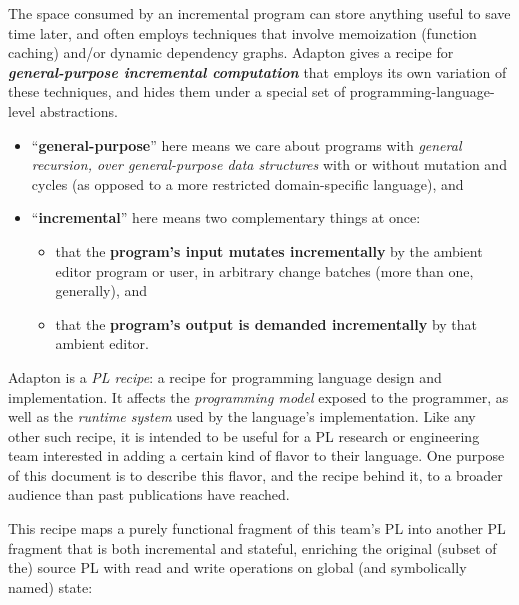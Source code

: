 \documentclass[11pt]{article}
\begin{document}
The space consumed by an incremental program can store anything useful
to save time later, and often employs techniques that involve
memoization (function caching) and/or dynamic dependency graphs.
%
Adapton gives a recipe for \textbf{\emph{general-purpose incremental
  computation}} that employs its own variation of these techniques,
and hides them under a special set of programming-language-level
abstractions.
%
\begin{itemize}
\item ``\textbf{general-purpose}'' here means we care about programs
  with \emph{general recursion, over general-purpose data structures}
  with or without mutation and cycles (as opposed to a more restricted
  domain-specific language), and

\item ``\textbf{incremental}'' here means two complementary things at once:
  \begin {itemize}

  \item that the \textbf{program's input mutates incrementally} by the
    ambient editor program or user, in arbitrary change batches (more than one, generally), and

  \item that the \textbf{program's output is demanded incrementally}
    by that ambient editor.
  \end{itemize}
\end{itemize}

\noindent
Adapton is a \emph{PL recipe}: a recipe for programming language
design and implementation.
%
It affects the \emph{programming model} exposed to the
programmer, as well as the \emph{runtime system} used by the
language's implementation.
%
Like any other such recipe, it is intended to be useful for a PL
research or engineering team interested in adding a certain kind of
flavor to their language.
%
One purpose of this document is to describe this flavor, and the
recipe behind it, to a broader audience than past publications have
reached.

This recipe maps a purely functional fragment of this team's PL into
another PL fragment that is both incremental and stateful, enriching
the original (subset of the) source PL with read and write operations
on global (and symbolically named) state:
\end{document}
